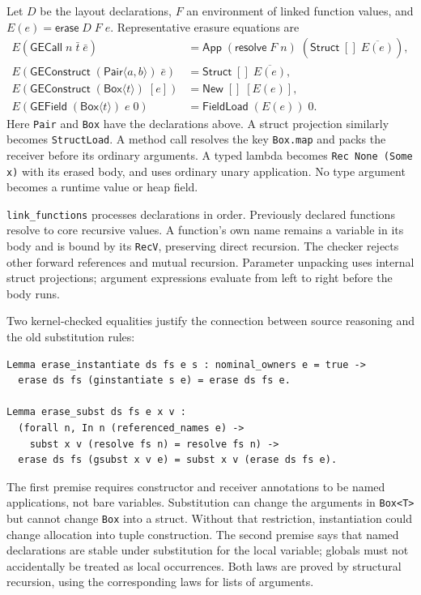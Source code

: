 \documentclass[11pt]{article}
\begin{document}
Let \(D\) be the layout declarations, \(F\) an environment of linked
function values, and \(E(e)=\mathsf{erase}\;D\;F\;e\).
Representative erasure equations are
\[
\begin{aligned}
E(\mathsf{GECall}\;n\;\bar t\;\bar e)
 &= \mathsf{App}\;(\mathsf{resolve}\;F\;n)
       \;(\mathsf{Struct}\;[]\;\overline{E(e)}),\\
E(\mathsf{GEConstruct}\;(\mathsf{Pair}\langle a,b\rangle)\;\bar e)
 &= \mathsf{Struct}\;[]\;\overline{E(e)},\\
E(\mathsf{GEConstruct}\;(\mathsf{Box}\langle t\rangle)\;[e])
 &= \mathsf{New}\;[]\;[E(e)],\\
E(\mathsf{GEField}\;(\mathsf{Box}\langle t\rangle)\;e\;0)
 &= \mathsf{FieldLoad}\;(E(e))\;0.
\end{aligned}
\]
Here \texttt{Pair} and \texttt{Box} have the declarations above.
A struct projection similarly becomes \texttt{StructLoad}.
A method call resolves the key \texttt{Box.map} and packs the receiver
before its ordinary arguments. A typed lambda becomes
\texttt{Rec None (Some x)} with its erased body, and uses ordinary unary
application. No type argument becomes a runtime value or heap field.

\texttt{link\_functions} processes declarations in order. Previously
declared functions resolve to core recursive values. A function's own name
remains a variable in its body and is bound by its \texttt{RecV}, preserving
direct recursion. The checker rejects other forward references and mutual
recursion. Parameter unpacking uses internal struct projections; argument
expressions evaluate from left to right before the body runs.

Two kernel-checked equalities justify the connection between source
reasoning and the old substitution rules:
\begin{lstlisting}
Lemma erase_instantiate ds fs e s : nominal_owners e = true ->
  erase ds fs (ginstantiate s e) = erase ds fs e.

Lemma erase_subst ds fs e x v :
  (forall n, In n (referenced_names e) ->
    subst x v (resolve fs n) = resolve fs n) ->
  erase ds fs (gsubst x v e) = subst x v (erase ds fs e).
\end{lstlisting}
The first premise requires constructor and receiver annotations to be
named applications, not bare variables. Substitution can change the
arguments in \texttt{Box<T>} but cannot change \texttt{Box} into a struct.
Without that restriction, instantiation could change allocation into tuple
construction. The second premise says that named declarations are stable
under substitution for the local variable; globals must not accidentally
be treated as local occurrences. Both laws are proved by structural
recursion, using the corresponding laws for lists of arguments.
\end{document}
